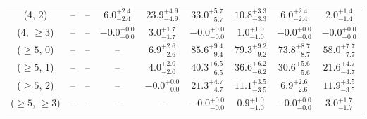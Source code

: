 \begin{table}[h!]
{\begin{tabular}{ccccccccc}
	(4, 2) & -- & -- & $6.0^{+ 2.4 }_{- 2.4 }$ & $23.9^{+ 4.9 }_{- 4.9 }$ & $33.0^{+ 5.7 }_{- 5.7 }$ & $10.8^{+ 3.3 }_{- 3.3 }$ & $6.0^{+ 2.4 }_{- 2.4 }$ & $2.0^{+ 1.4 }_{- 1.4 }$ \\[0.5ex] 
	(4, $\ge3$) & -- & -- & $-0.0^{+ 0.0 }_{- 0.0 }$ & $3.0^{+ 1.7 }_{- 1.7 }$ & $-0.0^{+ 0.0 }_{- 0.0 }$ & $1.0^{+ 1.0 }_{- 1.0 }$ & $-0.0^{+ 0.0 }_{- 0.0 }$ & $-0.0^{+ 0.0 }_{- 0.0 }$ \\[0.5ex] 
	($\ge5$, 0) & -- & -- & -- & $6.9^{+ 2.6 }_{- 2.6 }$ & $85.6^{+ 9.4 }_{- 9.4 }$ & $79.3^{+ 9.2 }_{- 9.2 }$ & $73.8^{+ 8.7 }_{- 8.7 }$ & $58.0^{+ 7.7 }_{- 7.7 }$ \\[0.5ex] 
	($\ge5$, 1) & -- & -- & -- & $4.0^{+ 2.0 }_{- 2.0 }$ & $40.3^{+ 6.5 }_{- 6.5 }$ & $36.6^{+ 6.2 }_{- 6.2 }$ & $30.6^{+ 5.6 }_{- 5.6 }$ & $21.6^{+ 4.7 }_{- 4.7 }$ \\[0.5ex] 
	($\ge5$, 2) & -- & -- & -- & $-0.0^{+ 0.0 }_{- 0.0 }$ & $21.3^{+ 4.7 }_{- 4.7 }$ & $11.1^{+ 3.5 }_{- 3.5 }$ & $6.9^{+ 2.6 }_{- 2.6 }$ & $11.9^{+ 3.5 }_{- 3.5 }$ \\[0.5ex] 
	($\ge5$, $\ge3$) & -- & -- & -- & -- & $-0.0^{+ 0.0 }_{- 0.0 }$ & $0.9^{+ 1.0 }_{- 1.0 }$ & $-0.0^{+ 0.0 }_{- 0.0 }$ & $3.0^{+ 1.7 }_{- 1.7 }$ \\[0.5ex] 
	\hline
	\hline
\end{tabular}}
\end{table}
